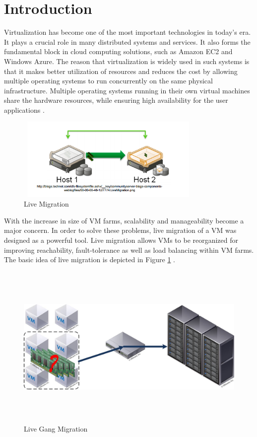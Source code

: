 \documentclass{acm_proc_article-sp}
\begin{document}
\setlength{\parindent}{0.5cm}
\section{Introduction}
Virtualization has become one of the most important technologies in today's era. It plays a crucial role in many distributed systems and services. It also forms the fundamental block in cloud computing solutions, such as Amazon EC2 \cite{ec2} and Windows Azure\cite{azure}. The reason that virtualization is widely used in such systems is that it makes better utilization of resources and reduces the cost by allowing multiple operating systems to run concurrently on the same physical infrastructure. Multiple operating systems running in their own virtual machines share the hardware resources, while ensuring high availability for the user applications \cite{virt_app}.
\par
\begin{figure}[ht]
\centering
        \includegraphics[height=4cm,width=9cm]{live_migration.png}
    \caption{Live Migration}
    \label{fig:live_migration}
\end{figure}
\indent With the increase in size of VM farms, scalability and manageability become a major concern. In order to solve these problems, live migration of a VM was  designed as a powerful tool. Live migration allows VMs to be reorganized for improving reachability, fault-tolerance as well as load balancing within VM farms. The basic idea of live migration is depicted in Figure \ref{fig:live_migration} \cite{live_migration}.
\par
\begin{figure}[ht]
\centering
        \includegraphics[height=8cm,width=18cm]{gang_migration.jpg}
    \caption{Live Gang Migration}
    \label{fig:gang_migration}
\end{figure}
\end{document}
